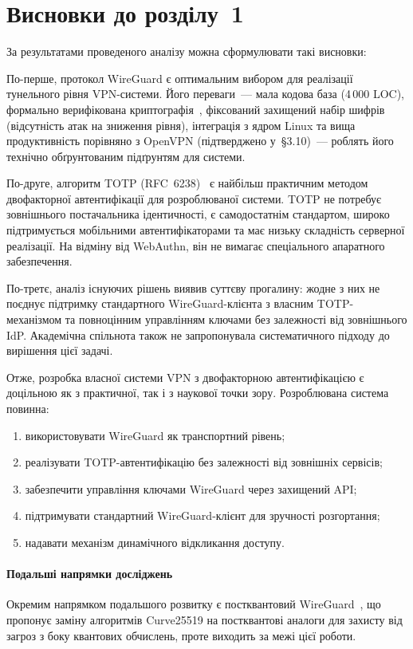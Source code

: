 \section{Висновки до розділу~1}
\label{sec:chapter1_conclusions}

За результатами проведеного аналізу можна сформулювати такі висновки:

По-перше, протокол WireGuard є оптимальним вибором для реалізації тунельного
рівня VPN-системи. Його переваги~--- мала кодова база (4\,000 LOC), формально
верифікована криптографія~\cite{lipp2019cryptographic}, фіксований захищений
набір шифрів (відсутність атак на зниження рівня), інтеграція з ядром Linux та
вища продуктивність порівняно з OpenVPN (підтверджено у~§3.10)~---
роблять його технічно обґрунтованим підґрунтям для системи.

По-друге, алгоритм TOTP (RFC~6238)~\cite{rfc6238} є найбільш практичним
методом двофакторної автентифікації для розроблюваної системи. TOTP не потребує
зовнішнього постачальника ідентичності, є самодостатнім стандартом, широко
підтримується мобільними автентифікаторами та має низьку складність
серверної реалізації. На відміну від WebAuthn, він не вимагає спеціального
апаратного забезпечення.

По-третє, аналіз існуючих рішень виявив суттєву прогалину: жодне з них не
поєднує підтримку стандартного WireGuard-клієнта з власним TOTP-механізмом
та повноцінним управлінням ключами без залежності від зовнішнього IdP.
Академічна спільнота також не запропонувала систематичного підходу до вирішення
цієї задачі.

Отже, розробка власної системи VPN з двофакторною автентифікацією
є доцільною як з практичної, так і з наукової точки зору. Розроблювана система
повинна:
\begin{enumerate}
  \item використовувати WireGuard як транспортний рівень;
  \item реалізувати TOTP-автентифікацію без залежності від зовнішніх сервісів;
  \item забезпечити управління ключами WireGuard через захищений API;
  \item підтримувати стандартний WireGuard-клієнт для зручності розгортання;
  \item надавати механізм динамічного відкликання доступу.
\end{enumerate}


\paragraph*{Подальші напрямки досліджень}

Окремим напрямком подальшого розвитку є постквантовий WireGuard~\cite{hulsing2021postquantum},
що пропонує заміну алгоритмів Curve25519 на постквантові аналоги для захисту
від загроз з боку квантових обчислень, проте виходить за межі цієї роботи.

\newpage
